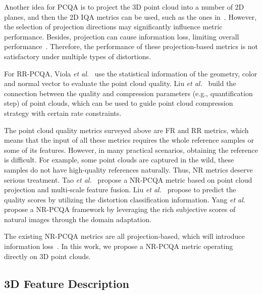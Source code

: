 \documentclass[acmsmall]{acmart}
\begin{document}
\par Another idea for PCQA is to project the 3D point cloud into a number of 2D planes, and then the 2D IQA metrics can be used, such as the ones in~\cite{torlig2018novel,alexiou2018pointt,Yang2020TMM3DTO2D,javaheri2021JPC}. However, the selection of projection directions may significantly influence metric performance. Besides, projection can cause information loss, limiting overall performance~\cite{yang2020graphsim}. Therefore, the performance of these projection-based metrics is not satisfactory under multiple types of distortions.

\par For RR-PCQA, Viola \emph{et al.}~\cite{Irene2020RR2} use the statistical information of the geometry, color and normal vector to evaluate the point cloud quality. Liu \emph{et al.}~\cite{Liu2021RR} build the connection between the quality and compression parameters (e.g., quantification step) of point clouds, which can be used to guide point cloud compression strategy with certain rate constraints.

\par The point cloud quality metrics surveyed above are FR and RR metrics, which means that the input of all these metrics requires the whole reference samples or some of its features. However, in many practical scenarios, obtaining the reference is difficult. For example, some point clouds are captured in the wild, these samples do not have high-quality references naturally. Thus, NR metrics deserve serious treatment. Tao \emph{et al.}~\cite{Tao2021PMBVQA} propose a NR-PCQA metric based on point cloud projection and multi-scale feature fusion. Liu \emph{et al.}~\cite{Liu2021PQANet} propose to predict the quality scores by utilizing the distortion classification information. Yang \emph{et al.}~\cite{Yang2021ITPCQA} propose a NR-PCQA framework by leveraging the rich subjective scores of natural images through the domain adaptation.

\par The existing NR-PCQA metrics are all projection-based, which will introduce information loss~\cite{yang2020graphsim}. In this work, we propose a NR-PCQA metric operating directly on 3D point clouds.

\subsection{3D Feature Description}
\end{document}
